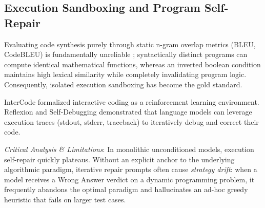 \documentclass{ieeeaccess}
\begin{document}
\subsection{Execution Sandboxing and Program Self-Repair}
Evaluating code synthesis purely through static n-gram overlap metrics (BLEU, CodeBLEU) is fundamentally unreliable \cite{chen2021humaneval}; syntactically distinct programs can compute identical mathematical functions, whereas an inverted boolean condition maintains high lexical similarity while completely invalidating program logic. Consequently, isolated execution sandboxing has become the gold standard.

InterCode \cite{yang2023intercode} formalized interactive coding as a reinforcement learning environment. Reflexion \cite{shinn2023reflexion} and Self-Debugging \cite{chen2023selfdebugging} demonstrated that language models can leverage execution traces (stdout, stderr, traceback) to iteratively debug and correct their code.

\textit{Critical Analysis \& Limitations}: In monolithic unconditioned models, execution self-repair quickly plateaus. Without an explicit anchor to the underlying algorithmic paradigm, iterative repair prompts often cause \textit{strategy drift}: when a model receives a Wrong Answer verdict on a dynamic programming problem, it frequently abandons the optimal paradigm and hallucinates an ad-hoc greedy heuristic that fails on larger test cases.
\end{document}

